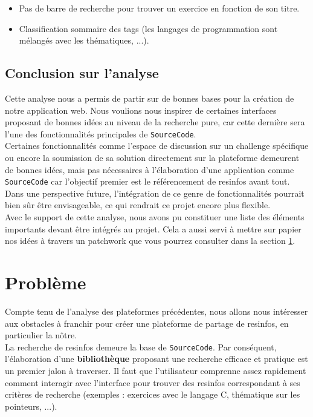 \begin{itemize}
    \item Pas de barre de recherche pour trouver un exercice en fonction de son titre.
    \item Classification sommaire des \glspl{tag} (les langages de programmation sont mélangés avec les thématiques, ...).
\end{itemize}

\subsection*{Conclusion sur l'analyse}

Cette analyse nous a permis de partir sur de bonnes bases pour la création de notre application web. Nous voulions nous inspirer de certaines interfaces proposant de bonnes idées au niveau de la recherche pure, car cette dernière sera l'une des fonctionnalités principales de \texttt{SourceCode}. \\

Certaines fonctionnalités comme l'espace de discussion sur un challenge spécifique ou encore la soumission de sa solution directement sur la plateforme demeurent de bonnes idées, mais pas nécessaires à l'élaboration d'une application comme \texttt{SourceCode} car l'objectif premier est le référencement de \glspl{resinfo} avant tout. Dans une perspective future, l'intégration de ce genre de fonctionnalités pourrait bien sûr être envisageable, ce qui rendrait ce projet encore plus flexible.\\

Avec le support de cette analyse, nous avons pu constituer une liste des éléments importants devant être intégrés au projet. Cela a aussi servi à mettre sur papier nos idées à travers un patchwork que vous pourrez consulter dans la section \ref{section:problem}.


\section{Problème}
\label{section:problem}

Compte tenu de l'analyse des plateformes précédentes, nous allons nous intéresser aux obstacles à franchir pour créer une plateforme de partage de \glspl{resinfo}, en particulier la nôtre.\\

La recherche de \glspl{resinfo} demeure la base de \texttt{SourceCode}. Par conséquent, l'élaboration d'une \textbf{bibliothèque} proposant une recherche efficace et pratique est un premier jalon à traverser. Il faut que l'utilisateur comprenne assez rapidement comment interagir avec l'interface pour trouver des \glspl{resinfo} correspondant à ses critères de recherche (exemples : exercices avec le langage C, thématique sur les pointeurs, ...).\\

